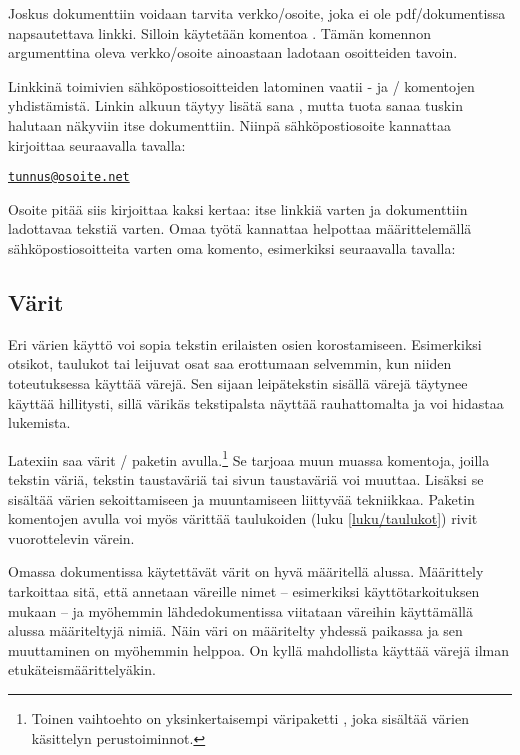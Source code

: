 Joskus dokumenttiin voidaan tarvita verkko\-/osoite, joka ei ole
pdf\-/dokumentissa napsautettava linkki. Silloin käytetään komentoa
. Tämän komennon argumenttina oleva verkko\-/osoite
ainoastaan ladotaan osoitteiden tavoin.

Linkkinä toimivien sähköpostiosoitteiden latominen vaatii
- ja \-/ komentojen yhdistämistä.
Linkin alkuun täytyy lisätä sana , mutta tuota sanaa
tuskin halutaan näkyviin itse dokumenttiin. Niinpä sähköpostiosoite
kannattaa kirjoittaa seuraavalla tavalla:

\begin{koodilohkosis}
\href{mailto:tunnus@osoite.net}{\nolinkurl{tunnus@osoite.net}}
\end{koodilohkosis}

Osoite pitää siis kirjoittaa kaksi kertaa: itse linkkiä varten ja
dokumenttiin ladottavaa tekstiä varten. Omaa työtä kannattaa helpottaa
määrittelemällä sähköpostiosoitteita varten oma komento, esimerkiksi
seuraavalla tavalla:

\begin{koodilohkosis}
\newcommand{\sposti}[1]{\href{mailto:#1}{\nolinkurl{#1}}}
\end{koodilohkosis}

\subsection{Värit}
\label{luku/korostus-värit}

Eri värien käyttö voi sopia tekstin erilaisten osien korostamiseen.
Esimerkiksi otsikot, taulukot tai leijuvat osat saa erottumaan
selvemmin, kun niiden toteutuksessa käyttää värejä. Sen sijaan
leipätekstin sisällä värejä täytynee käyttää hillitysti, sillä värikäs
tekstipalsta näyttää rauhattomalta ja voi hidastaa lukemista.

Latexiin saa värit \-/ paketin
avulla.\footnote{Toinen vaihtoehto on yksinkertaisempi väripaketti
  , joka sisältää värien käsittelyn perustoiminnot.} Se
tarjoaa muun muassa komentoja, joilla tekstin väriä, tekstin taustaväriä
tai sivun taustaväriä voi muuttaa. Lisäksi se sisältää värien
sekoittamiseen ja muuntamiseen liittyvää tekniikkaa. Paketin komentojen
avulla voi myös värittää taulukoiden (luku \ref{luku/taulukot}) rivit
vuorottelevin värein.

Omassa dokumentissa käytettävät värit on hyvä määritellä alussa.
Määrittely tarkoittaa sitä, että annetaan väreille nimet -- esimerkiksi
käyttötarkoituksen mukaan -- ja myöhemmin lähdedokumentissa viitataan
väreihin käyttämällä alussa määriteltyjä nimiä. Näin väri on määritelty
yhdessä paikassa ja sen muuttaminen on myöhemmin helppoa. On kyllä
mahdollista käyttää värejä ilman etukäteismäärittelyäkin.

